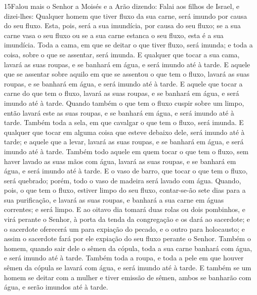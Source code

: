 \medskip

\lettrine{15} Falou mais o Senhor a Moisés e a Arão dizendo:
Falai aos filhos de Israel, e dizei-lhes: Qualquer homem que
tiver fluxo da sua carne, será imundo por causa do seu fluxo.
Esta, pois, será a sua imundícia, por causa do seu fluxo; se a
sua carne vasa o seu fluxo ou se a sua carne estanca o seu fluxo,
esta é a sua imundícia. Toda a cama, em que se deitar o que
tiver fluxo, será imunda; e toda a coisa, sobre o que se assentar,
será imunda. E qualquer que tocar a sua cama, lavará as suas
roupas, e se banhará em água, e será imundo até à tarde. E
aquele que se assentar sobre aquilo em que se assentou o que tem o
fluxo, lavará as suas roupas, e se banhará em água, e será imundo
até à tarde. E aquele que tocar a carne do que tem o fluxo,
lavará as suas roupas, e se banhará em água, e será imundo até à
tarde. Quando também o que tem o fluxo cuspir sobre um limpo,
então lavará este as suas roupas, e se banhará em água, e será
imundo até à tarde. Também toda a sela, em que cavalgar o que
tem o fluxo, será imunda. E qualquer que tocar em alguma
coisa que esteve debaixo dele, será imundo até à tarde; e aquele que
a levar, lavará as suas roupas, e se banhará em água, e será imundo
até à tarde. Também todo aquele em quem tocar o que tem o
fluxo, sem haver lavado as suas mãos com água, lavará as suas
roupas, e se banhará em água, e será imundo até à tarde. E o
vaso de barro, que tocar o que tem o fluxo, será quebrado; porém,
todo o vaso de madeira será lavado com água. Quando, pois, o
que tem o fluxo, estiver limpo do seu fluxo, contar-se-ão sete dias
para a sua purificação, e lavará as suas roupas, e banhará a sua
carne em águas correntes; e será limpo. E ao oitavo dia
tomará duas rolas ou dois pombinhos, e virá perante o Senhor, à
porta da tenda da congregação e os dará ao sacerdote; e o
sacerdote oferecerá um para expiação do pecado, e o outro para
holocausto; e assim o sacerdote fará por ele expiação do seu fluxo
perante o Senhor. Também o homem, quando sair dele o sêmen da
cópula, toda a sua carne banhará com água, e será imundo até à
tarde. Também toda a roupa, e toda a pele em que houver sêmen
da cópula se lavará com água, e será imundo até à tarde. E
também se um homem se deitar com a mulher e tiver emissão de sêmen,
ambos se banharão com água, e serão imundos até à tarde.

